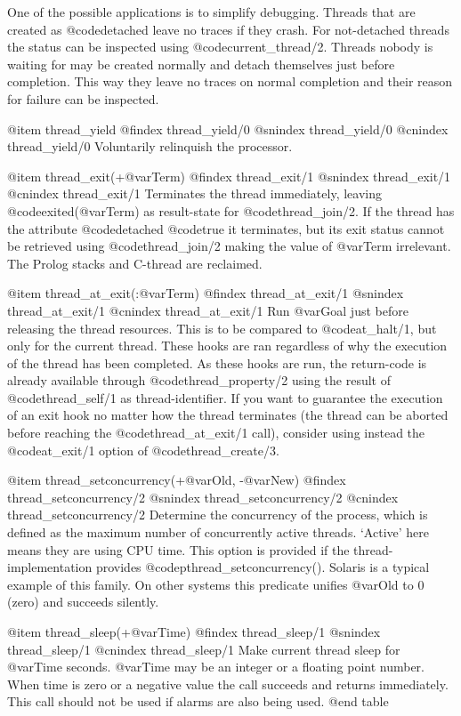 One of the possible applications is to simplify debugging. Threads that
are created as @code{detached} leave no traces if they crash. For
not-detached threads the status can be inspected using
@code{current_thread/2}.  Threads nobody is waiting for may be created
normally and detach themselves just before completion.  This way they
leave no traces on normal completion and their reason for failure can be
inspected.

@item thread_yield
@findex thread_yield/0
@snindex thread_yield/0
@cnindex thread_yield/0
Voluntarily relinquish the processor.

@item thread_exit(+@var{Term})
@findex thread_exit/1
@snindex thread_exit/1
@cnindex thread_exit/1
Terminates the thread immediately, leaving @code{exited(@var{Term})} as
result-state for @code{thread_join/2}.  If the thread has the attribute
@code{detached} @code{true} it terminates, but its exit status cannot be
retrieved using @code{thread_join/2} making the value of @var{Term}
irrelevant.  The Prolog stacks and C-thread are reclaimed.

@item thread_at_exit(:@var{Term})
@findex thread_at_exit/1
@snindex thread_at_exit/1
@cnindex thread_at_exit/1
Run @var{Goal} just before releasing the thread resources. This is to
be compared to @code{at_halt/1}, but only for the current
thread. These hooks are ran regardless of why the execution of the
thread has been completed. As these hooks are run, the return-code is
already available through @code{thread_property/2} using the result of
@code{thread_self/1} as thread-identifier. If you want to guarantee the 
execution of an exit hook no matter how the thread terminates (the thread 
can be aborted before reaching the @code{thread_at_exit/1} call), consider
using instead the @code{at_exit/1} option of @code{thread_create/3}. 

@item thread_setconcurrency(+@var{Old}, -@var{New})
@findex thread_setconcurrency/2
@snindex thread_setconcurrency/2
@cnindex thread_setconcurrency/2
Determine the concurrency of the process, which is defined as the
maximum number of concurrently active threads. `Active' here means
they are using CPU time. This option is provided if the
thread-implementation provides
@code{pthread_setconcurrency()}. Solaris is a typical example of this
family. On other systems this predicate unifies @var{Old} to 0 (zero)
and succeeds silently.

@item thread_sleep(+@var{Time})
@findex thread_sleep/1
@snindex thread_sleep/1
@cnindex thread_sleep/1
Make current thread sleep for @var{Time} seconds. @var{Time} may be an
integer or a floating point number. When time is zero or a negative value 
the call succeeds and returns immediately. This call should not be used if
alarms are also being used.
@end table


